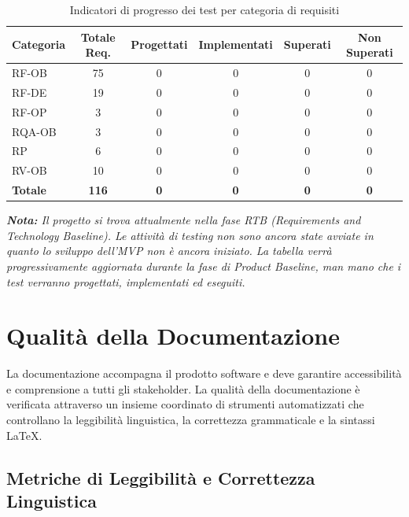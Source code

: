 \documentclass[a4paper,11pt,oneside]{scrartcl}
\begin{document}
\begin{table}[H]
\centering
\renewcommand{\arraystretch}{1.3}
\begin{tabularx}{\textwidth}{@{}lCCCCC@{}}
\toprule
\textbf{Categoria} & \textbf{Totale Req.} & \textbf{Progettati} & \textbf{Implementati} & \textbf{Superati} & \textbf{Non Superati} \\
\midrule
RF-OB  & 75 & 0 & 0 & 0 & 0 \\
RF-DE  & 19 & 0 & 0 & 0 & 0 \\
RF-OP  &  3 & 0 & 0 & 0 & 0 \\
RQA-OB &  3 & 0 & 0 & 0 & 0 \\
RP     &  6 & 0 & 0 & 0 & 0 \\
RV-OB  & 10 & 0 & 0 & 0 & 0 \\
\midrule
\textbf{Totale} & \textbf{116} & \textbf{0} & \textbf{0} & \textbf{0} & \textbf{0} \\
\bottomrule
\end{tabularx}
\caption{Indicatori di progresso dei test per categoria di requisiti}
\end{table}

\vspace{0.3cm}
\noindent\textit{\textbf{Nota:} Il progetto si trova attualmente nella fase RTB (Requirements and Technology Baseline). Le attività di testing non sono ancora state avviate in quanto lo sviluppo dell'MVP non è ancora iniziato. La tabella verrà progressivamente aggiornata durante la fase di Product Baseline, man mano che i test verranno progettati, implementati ed eseguiti.}

\newpage
\section{Qualità della Documentazione}

La documentazione accompagna il prodotto software e deve garantire accessibilità e comprensione a tutti gli stakeholder{\scriptsize{}}. La qualità della documentazione è verificata attraverso un insieme coordinato di strumenti automatizzati che controllano la leggibilità linguistica, la correttezza grammaticale e la sintassi \LaTeX.

\subsection{Metriche di Leggibilità e Correttezza Linguistica}
\end{document}
